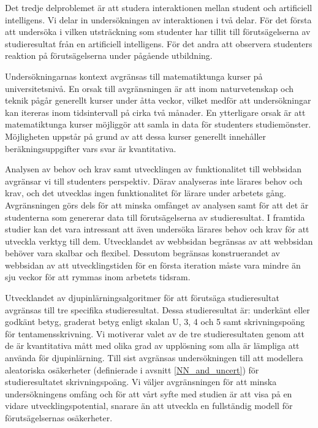 Det tredje delproblemet är att studera interaktionen mellan student och artificiell intelligens. Vi delar in undersökningen av interaktionen i två delar. För det första att undersöka i vilken utsträckning som studenter har tillit till förutsägelserna av studieresultat från en artificiell intelligens. För det andra att observera studenters reaktion på förutsägelserna under pågående utbildning. 

Undersökningarnas kontext avgränsas till matematiktunga kurser på universitetsnivå. En orsak till avgränsningen är att inom naturvetenskap och teknik pågår generellt kurser under åtta veckor, vilket medför att undersökningar kan itereras inom tidsintervall på cirka två månader. En ytterligare orsak är att matematiktunga kurser möjliggör att samla in data för studenters studiemönster. Möjligheten uppstår på grund av att dessa kurser generellt innehåller beräkningsuppgifter vars svar är kvantitativa.

Analysen av behov och krav samt utvecklingen av funktionalitet till webbsidan avgränsar vi till studenters perspektiv. Därav analyseras inte lärares behov och krav, och det utvecklas ingen funktionalitet för lärare under arbetets gång. Avgränsningen görs dels för att minska omfånget av analysen samt för att det är studenterna som genererar data till förutsägelserna av studieresultat. I framtida studier kan det vara intressant att även undersöka lärares behov och krav för att utveckla verktyg till dem. Utvecklandet av webbsidan begränsas av att webbsidan behöver vara skalbar och flexibel. Dessutom begränsas konstruerandet av webbsidan av att utvecklingstiden för en första iteration måste vara mindre än sju veckor för att rymmas inom arbetets tidsram.

Utvecklandet av djupinlärningsalgoritmer för att förutsäga studieresultat avgränsas till tre specifika studieresultat. Dessa studieresultat är: underkänt eller godkänt betyg, graderat betyg enligt skalan U, 3, 4 och 5 samt skrivningspoäng för tentamensskrivning. Vi motiverar valet av de tre studieresultaten genom att de är kvantitativa mått med olika grad av upplösning som alla är lämpliga att använda för djupinlärning. Till sist avgränsas undersökningen till att modellera aleatoriska osäkerheter (definierade i avsnitt \ref{NN_and_uncert}) för studieresultatet skrivningspoäng. Vi väljer avgränsningen för att minska undersökningens omfång och för att vårt syfte med studien är att visa på en vidare utvecklingspotential, snarare än att utveckla en fullständig modell för förutsägelsernas osäkerheter.

